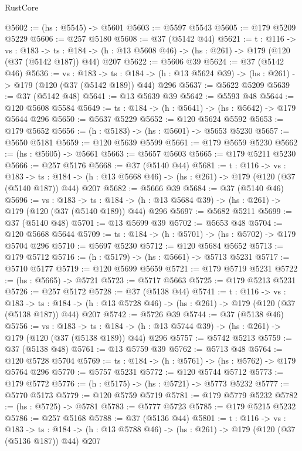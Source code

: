 \begin{lexlean}{RustCore}
\begin{coremodule}
@5602 := (hs : @5545) -> @5601
@5603 := @5597 @5543
@5605 := @179 @5209 @5229
@5606 := @257 @5180
@5608 := @37 (@5142 @44)
@5621 := {t : @116} ->
  {vs : @183} ->
  {ts : @184} -> (h : @13 @5608 @46) -> (hs : @261) -> @179 (@120 (@37 (@5142 @187)) @44) @207
@5622 := @5606 @39
@5624 := @37 (@5142 @46)
@5636 := {vs : @183} ->
  {ts : @184} -> (h : @13 @5624 @39) -> (hs : @261) -> @179 (@120 (@37 (@5142 @189)) @44) @296
@5637 := @5622 @5209
@5639 := @37 (@5142 @48)
@5641 := @13 @5639 @39
@5642 := @5593 @48
@5644 := @120 @5608 @5584
@5649 := {ts : @184} -> (h : @5641) -> (hs : @5642) -> @179 @5644 @296
@5650 := @5637 @5229
@5652 := @120 @5624 @5592
@5653 := @179 @5652
@5656 := (h : @5183) -> (hs : @5601) -> @5653 @5230
@5657 := @5650 @5181
@5659 := @120 @5639 @5599
@5661 := @179 @5659 @5230
@5662 := (hs : @5605) -> @5661
@5663 := @5657 @5603
@5665 := @179 @5211 @5230
@5666 := @257 @5176
@5668 := @37 (@5140 @44)
@5681 := {t : @116} ->
  {vs : @183} ->
  {ts : @184} -> (h : @13 @5668 @46) -> (hs : @261) -> @179 (@120 (@37 (@5140 @187)) @44) @207
@5682 := @5666 @39
@5684 := @37 (@5140 @46)
@5696 := {vs : @183} ->
  {ts : @184} -> (h : @13 @5684 @39) -> (hs : @261) -> @179 (@120 (@37 (@5140 @189)) @44) @296
@5697 := @5682 @5211
@5699 := @37 (@5140 @48)
@5701 := @13 @5699 @39
@5702 := @5653 @48
@5704 := @120 @5668 @5644
@5709 := {ts : @184} -> (h : @5701) -> (hs : @5702) -> @179 @5704 @296
@5710 := @5697 @5230
@5712 := @120 @5684 @5652
@5713 := @179 @5712
@5716 := (h : @5179) -> (hs : @5661) -> @5713 @5231
@5717 := @5710 @5177
@5719 := @120 @5699 @5659
@5721 := @179 @5719 @5231
@5722 := (hs : @5665) -> @5721
@5723 := @5717 @5663
@5725 := @179 @5213 @5231
@5726 := @257 @5172
@5728 := @37 (@5138 @44)
@5741 := {t : @116} ->
  {vs : @183} ->
  {ts : @184} -> (h : @13 @5728 @46) -> (hs : @261) -> @179 (@120 (@37 (@5138 @187)) @44) @207
@5742 := @5726 @39
@5744 := @37 (@5138 @46)
@5756 := {vs : @183} ->
  {ts : @184} -> (h : @13 @5744 @39) -> (hs : @261) -> @179 (@120 (@37 (@5138 @189)) @44) @296
@5757 := @5742 @5213
@5759 := @37 (@5138 @48)
@5761 := @13 @5759 @39
@5762 := @5713 @48
@5764 := @120 @5728 @5704
@5769 := {ts : @184} -> (h : @5761) -> (hs : @5762) -> @179 @5764 @296
@5770 := @5757 @5231
@5772 := @120 @5744 @5712
@5773 := @179 @5772
@5776 := (h : @5175) -> (hs : @5721) -> @5773 @5232
@5777 := @5770 @5173
@5779 := @120 @5759 @5719
@5781 := @179 @5779 @5232
@5782 := (hs : @5725) -> @5781
@5783 := @5777 @5723
@5785 := @179 @5215 @5232
@5786 := @257 @5168
@5788 := @37 (@5136 @44)
@5801 := {t : @116} ->
  {vs : @183} ->
  {ts : @184} -> (h : @13 @5788 @46) -> (hs : @261) -> @179 (@120 (@37 (@5136 @187)) @44) @207

\end{coremodule}
\end{lexlean}
